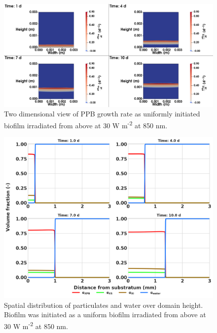 \begin{figure}[H]
    \centering
     \hspace*{-1cm}\includegraphics[width=1.1\textwidth,height=0.4\textheight]{Chap4/methods/data/figures/case4_growth_frac.png}
    \caption{Two dimensional view of PPB growth rate as uniformly initiated biofilm irradiated from above at 30 W m\textsuperscript{-2} at 850 nm.} 
    \label{fig:case4_growth_frac}
\end{figure}

\begin{figure}[H]
    \centering
    \includegraphics[width=\textwidth,height=0.45\textheight]{Chap4/methods/output/case4.png}
    \caption{Spatial distribution of particulates and water over domain height. Biofilm was initiated as a uniform biofilm irradiated from above at 30 W m\textsuperscript{-2} at 850 nm.} 
    \label{fig:case4_dist_frac}
\end{figure}






